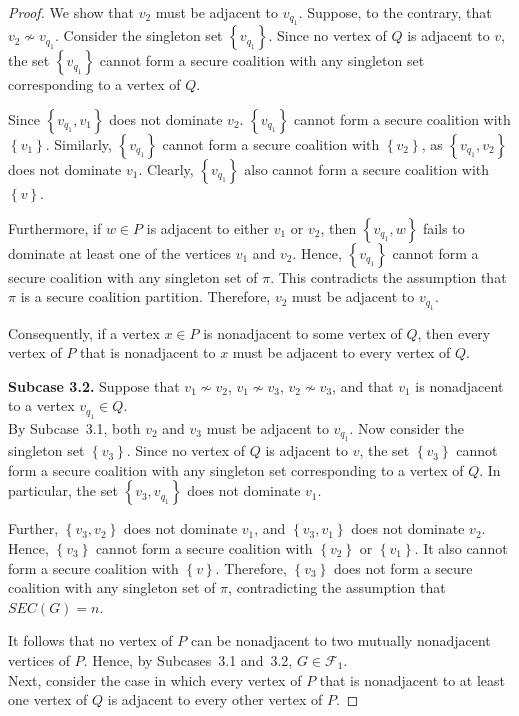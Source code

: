 \documentclass[12pt]{article}
\begin{document}
\begin{proof}
We show that $v_2$ must be adjacent to $v_{q_1}$. Suppose, to the contrary, that $v_2\not\sim v_{q_1}$. Consider the singleton set $\left\{v_{q_1}\right\}$. Since no vertex of $Q$ is adjacent to $v$, the set $\left\{v_{q_1}\right\}$ cannot form a secure coalition with any singleton set corresponding to a vertex of $Q$.

Since $\left\{v_{q_1},v_1\right\}$ does not dominate $v_2$. $\left\{v_{q_1}\right\}$ cannot form a secure coalition with $\left\{v_1\right\}$.  Similarly, $\left\{v_{q_1}\right\}$ cannot form a secure coalition with $\left\{v_2\right\}$, as $\left\{v_{q_1},v_2\right\}$ does not dominate $v_1$. Clearly, $\left\{v_{q_1}\right\}$ also cannot form a secure coalition with $\left\{v\right\}$.

Furthermore, if $w\in P$ is adjacent to either $v_1$ or $v_2$, then $\left\{v_{q_1},w\right\}$ fails to dominate at least one of the vertices $v_1$ and $v_2$. Hence, $\left\{v_{q_1}\right\}$ cannot form a secure coalition with any singleton set of $\pi$.
This contradicts the assumption that $\pi$ is a secure coalition partition. Therefore, $v_2$ must be adjacent to $v_{q_1}$.

Consequently, if a vertex $x\in P$ is nonadjacent to some vertex of $Q$, then every vertex of $P$ that is nonadjacent to $x$ must be adjacent to every vertex of $Q$.

\medskip

\textbf{Subcase 3.2.} Suppose that $v_1\not\sim v_2$, $v_1\not\sim v_3$, $v_2\not\sim v_3$, and that $v_1$ is nonadjacent to a vertex $v_{q_1}\in Q$.\\
By Subcase~3.1, both $v_2$ and $v_3$ must be adjacent to $v_{q_1}$. Now consider the singleton set $\left\{v_3\right\}$. Since no vertex of $Q$ is adjacent to $v$, the set $\left\{v_3\right\}$ cannot form a secure coalition with any singleton set corresponding to a vertex of $Q$. In particular, the set $\left\{v_3,v_{q_1}\right\}$ does not dominate $v_1$.

Further, $\left\{v_3,v_2\right\}$ does not dominate $v_1$, and $\left\{v_3,v_1\right\}$ does not dominate $v_2$. Hence, $\left\{v_3\right\}$ cannot form a secure coalition with $\left\{v_2\right\}$ or $\left\{v_1\right\}$. It also cannot form a secure coalition with $\left\{v\right\}$. Therefore, $\left\{v_3\right\}$ does not form a secure coalition with any singleton set of $\pi$, contradicting the assumption that $SEC(G)=n$.

It follows that no vertex of $P$ can be nonadjacent to two mutually nonadjacent vertices of $P$. Hence, by Subcases~3.1 and~3.2, $G\in\mathcal{F}_1$.\\[2mm]
Next, consider the case in which every vertex of $P$ that is nonadjacent to at least one vertex of $Q$ is adjacent to every other vertex of $P$.


\end{proof}
\end{document}
